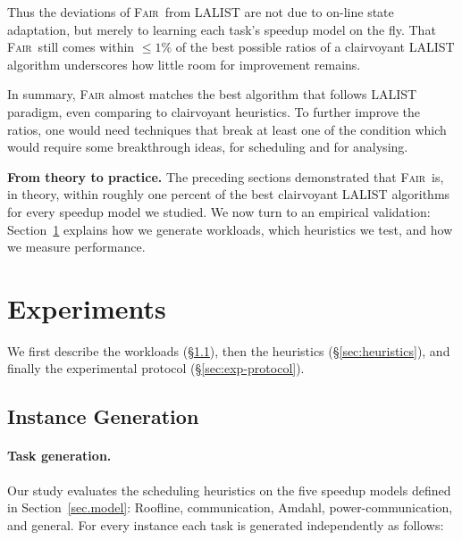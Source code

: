\documentclass{article}
\newcommand\fair{\textsc{Fair}\xspace}
\begin{document}
Thus the deviations of \fair\ from \textsc{LALIST} are not due to on-line state adaptation, but merely to learning each task’s speedup model on the fly.  
That \fair\ still comes within \(\le 1\%\) of the best possible ratios of a clairvoyant \textsc{LALIST} algorithm underscores how little room for improvement remains.


In summary, \fair almost matches the best algorithm that follows \textsc{LALIST} paradigm, even comparing to clairvoyant heuristics. To further improve the ratios, one would need techniques that break at least one of the condition  which would require some breakthrough ideas, for scheduling and for analysing.

\noindent
\textbf{From theory to practice.}
The preceding sections demonstrated that \fair\ is, in theory, within roughly
one percent of the best clairvoyant \textsc{LALIST} algorithms for every
speedup model we studied.
We now turn to an empirical validation: Section~\ref{sec.experiments} explains
how we generate workloads, which heuristics we test, and how we measure
performance.

\section{Experiments}
\label{sec.experiments}

We first describe the workloads (§\ref{sec:instance-gen}), then the
heuristics (§\ref{sec:heuristics}), and finally the experimental
protocol (§\ref{sec:exp-protocol}).

\subsection{Instance Generation}
\label{sec:instance-gen}
\paragraph{Task generation.}
Our study evaluates the scheduling heuristics on the five speedup models
defined in Section~\ref{sec.model}:
Roofline, communication, Amdahl, power-communication, and general.
For every instance each task is generated independently as follows:
\end{document}
